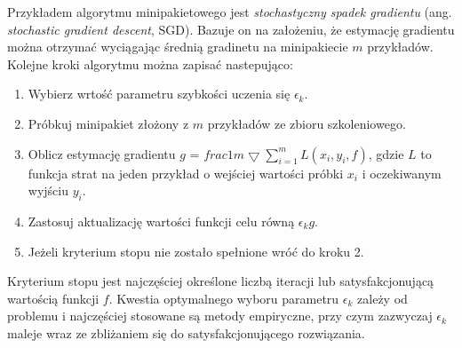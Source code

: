 Przykładem algorytmu minipakietowego jest \textit{stochastyczny spadek gradientu} (ang. \textit{stochastic gradient descent}, SGD). Bazuje on na założeniu, że estymację gradientu można otrzymać wyciągając średnią gradinetu na minipakiecie $m$ przykładów. Kolejne kroki algorytmu można zapisać nastepująco:
\begin{enumerate}
	\item Wybierz wrtość parametru szybkości uczenia się $\epsilon_k$.
	\item Próbkuj minipakiet złożony z $m$ przykładów ze zbioru szkoleniowego.
	\item Oblicz estymację gradientu $g$ = $frac{1}{m}\bigtriangledown \sum_{i=1}^{m}L(x_i, y_i, f)$, gdzie $L$ to funkcja strat na jeden przykład o wejściej wartości próbki $x_i$ i oczekiwanym wyjściu $y_i$.
	\item Zastosuj aktualizację wartości funkcji celu równą $\epsilon_k g$.
	\item Jeżeli kryterium stopu nie zostało spełnione wróć do kroku 2. 
\end{enumerate}

Kryterium stopu jest najczęściej określone liczbą iteracji lub satysfakcjonującą wartością funkcji $f$. Kwestia optymalnego wyboru parametru $\epsilon_k$ zależy od problemu i najczęściej stosowane są metody empiryczne, przy czym zazwyczaj $\epsilon_k$ maleje wraz ze zbliżaniem się do satysfakcjonującego rozwiązania.

